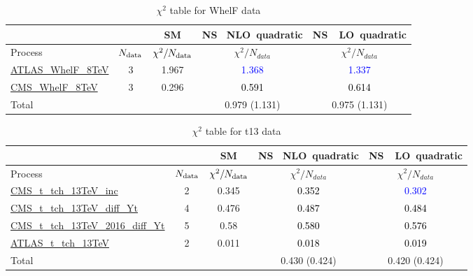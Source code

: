 \documentclass{article}
\begin{document}
\begin{table}[H]
\centering
\begin{tabular}{|l|c|c|c|c|}
\hline
 \multicolumn{2}{|c|}{} & SM& \rm NS \ NLO\ quadratic& \rm NS\ \ LO\ quadratic\\ \hline
Process & $N_{\rm data}$ & $\chi^ 2/N_{\rm data}$& $\chi^ 2/N_{data}$& $\chi^ 2/N_{data}$\\ \hline
\href{https://arxiv.org/abs/1612.02577}{ATLAS_WhelF_8TeV} & 3 & 1.967 & \textcolor{blue}                            {1.368} & \textcolor{blue}                            {1.337} \\ \hline
\href{https://arxiv.org/abs/1605.09047}{CMS_WhelF_8TeV} & 3 & 0.296 & \textcolor{black}                            {0.591} & \textcolor{black}                            {0.614} \\ \hline
\hline Total & &  & 0.979 (1.131) & 0.975 (1.131) \\ \hline
\end{tabular}
\caption{$\chi^2$ table for WhelF data}
\end{table}
\begin{table}[H]
\centering
\begin{tabular}{|l|c|c|c|c|}
\hline
 \multicolumn{2}{|c|}{} & SM& \rm NS \ NLO\ quadratic& \rm NS\ \ LO\ quadratic\\ \hline
Process & $N_{\rm data}$ & $\chi^ 2/N_{\rm data}$& $\chi^ 2/N_{data}$& $\chi^ 2/N_{data}$\\ \hline
\href{https://arxiv.org/abs/1610.00678}{CMS_t_tch_13TeV_inc} & 2 & 0.345 & \textcolor{black}                            {0.352} & \textcolor{blue}                            {0.302} \\ \hline
\href{https://cds.cern.ch/record/2151074}{CMS_t_tch_13TeV_diff_Yt} & 4 & 0.476 & \textcolor{black}                            {0.487} & \textcolor{black}                            {0.484} \\ \hline
\href{https://arxiv.org/abs/1907.08330}{CMS_t_tch_13TeV_2016_diff_Yt} & 5 & 0.58 & \textcolor{black}                            {0.580} & \textcolor{black}                            {0.576} \\ \hline
\href{https://arxiv.org/abs/1609.03920}{ATLAS_t_tch_13TeV} & 2 & 0.011 & \textcolor{black}                            {0.018} & \textcolor{black}                            {0.019} \\ \hline
\hline Total & &  & 0.430 (0.424) & 0.420 (0.424) \\ \hline
\end{tabular}
\caption{$\chi^2$ table for t13 data}
\end{table}
\end{document}
